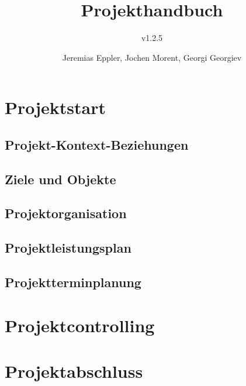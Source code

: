 \documentclass[10pt,a4paper]{scrreprt}
\title{Projekthandbuch}
\subtitle{v1.2.5}
\author{Jeremias Eppler, Jochen Morent, Georgi Georgiev}
\begin{document}
\maketitle
\tableofcontents
\newpage
\chapter{Projektstart}
	\section{Projekt-Kontext-Beziehungen}
		
		\newpage
		
		\newpage
		
	\clearpage
	\section{Ziele und Objekte}
		
	\clearpage
	\section{Projektorganisation}
		
	\clearpage
	\section{Projektleistungsplan}
		
		\newpage
		
	\clearpage
	\section{Projektterminplanung}
		
		\newpage
		
		\newpage
		

\newpage
\chapter{Projektcontrolling}
	
	\clearpage
	

\newpage
\chapter{Projektabschluss}
%	
\end{document}
